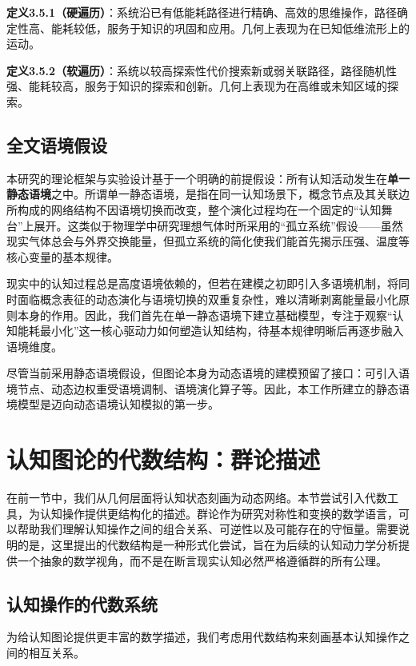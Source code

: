 \documentclass[12pt,a4paper]{article}
\begin{document}
\textbf{定义3.5.1（硬遍历）}：系统沿已有低能耗路径进行精确、高效的思维操作，路径确定性高、能耗较低，服务于知识的巩固和应用。几何上表现为在已知低维流形上的运动。

\textbf{定义3.5.2（软遍历）}：系统以较高探索性代价搜索新或弱关联路径，路径随机性强、能耗较高，服务于知识的探索和创新。几何上表现为在高维或未知区域的探索。

\subsection{全文语境假设}

本研究的理论框架与实验设计基于一个明确的前提假设：所有认知活动发生在\textbf{单一静态语境}之中。所谓单一静态语境，是指在同一认知场景下，概念节点及其关联边所构成的网络结构不因语境切换而改变，整个演化过程均在一个固定的“认知舞台”上展开。这类似于物理学中研究理想气体时所采用的“孤立系统”假设——虽然现实气体总会与外界交换能量，但孤立系统的简化使我们能首先揭示压强、温度等核心变量的基本规律。

现实中的认知过程总是高度语境依赖的，但若在建模之初即引入多语境机制，将同时面临概念表征的动态演化与语境切换的双重复杂性，难以清晰剥离能量最小化原则本身的作用。因此，我们首先在单一静态语境下建立基础模型，专注于观察“认知能耗最小化”这一核心驱动力如何塑造认知结构，待基本规律明晰后再逐步融入语境维度。

尽管当前采用静态语境假设，但图论本身为动态语境的建模预留了接口：可引入语境节点、动态边权重受语境调制、语境演化算子等。因此，本工作所建立的静态语境模型是迈向动态语境认知模拟的第一步。

\section{认知图论的代数结构：群论描述}

在前一节中，我们从几何层面将认知状态刻画为动态网络。本节尝试引入代数工具，为认知操作提供更结构化的描述。群论作为研究对称性和变换的数学语言，可以帮助我们理解认知操作之间的组合关系、可逆性以及可能存在的守恒量。需要说明的是，这里提出的代数结构是一种形式化尝试，旨在为后续的认知动力学分析提供一个抽象的数学视角，而不是在断言现实认知必然严格遵循群的所有公理。

\subsection{认知操作的代数系统}

为给认知图论提供更丰富的数学描述，我们考虑用代数结构来刻画基本认知操作之间的相互关系。
\end{document}
